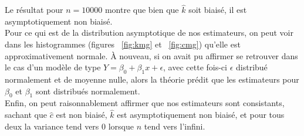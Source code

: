 Le résultat pour $n=10000$ montre que bien que $\hat{k}$ soit biaisé, il est asymptotiquement non biaisé. \\
Pour ce qui est de la distribution asymptotique de nos estimateurs, on peut voir dans les histogrammes (figures ~\ref{fig:kmg} et ~\ref{fig:cmg}) qu'elle est approximativement normale. \`A nouveau, si on avait pu affirmer se retrouver dans le cas d'un modèle de type $Y = \beta_0 + \beta_1x + \epsilon$, avec cette fois-ci $\epsilon$ distribué normalement et de moyenne nulle, alors la théorie prédit que les estimateurs pour $\beta_0$ et $\beta_1$ sont distribués normalement.\\
Enfin, on peut raisonnablement affirmer que nos estimateurs sont consistants, sachant que $\hat{c}$ est non biaisé, $\hat{k}$ est asymptotiquement non biaisé, et pour tous deux la variance tend vers $0$ lorsque $n$ tend vers l'infini.
